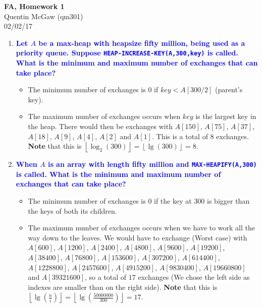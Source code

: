 \documentclass[11pt]{article}
\begin{document}
\begin{center} {\Large\bf FA, Homework 1}  \\ Quentin McGaw (qm301) \\ 02/02/17
\end{center}

\begin{enumerate}
\item \textbf{\textcolor{blue}{Let $A$ be a max-heap with heapsize fifty million, being used as a priority queue.  Suppose {\tt HEAP-INCREASE-KEY(A,300,key)} is called. What is the minimum and maximum number of exchanges that can take place?}}
    \begin{itemize}
        \item The minimum number of exchanges is $0$ if $key < A[300/2]$ (parent's key).
        \item The maximum number of exchanges occurs when $key$ is the largest key in the heap. There would then be exchanges with $A[150]$, $A[75]$, $A[37]$, $A[18]$, $A[9]$, $A[4]$, $A[2]$ and $A[1]$. This is a total of $8$ exchanges. \textbf{Note} that this is $\left \lfloor{\log_2(300)}\right \rfloor = \left \lfloor{\lg(300)}\right \rfloor = 8$.
    \end{itemize}
    
\item \textbf{\textcolor{blue}{When $A$ is an array with length fifty million and {\tt MAX-HEAPIFY(A,300)} is called. What is the minimum and maximum number of exchanges that can take place?}}
    \begin{itemize}
        \item The minimum number of exchanges is $0$ if the key at $300$ is bigger than the keys of both its children.
        \item The maximum number of exchanges occurs when we have to work all the way down to the leaves. We would have to exchange (Worst case) with $A[600]$, $A[1200]$, $A[2400]$, $A[4800]$, $A[9600]$, $A[19200]$, $A[38400]$, $A[76800]$, $A[153600]$, $A[307200]$, $A[614400]$, $A[1228800]$, $A[2457600]$, $A[4915200]$, $A[9830400]$, $A[19660800]$ and $A[39321600]$, so a total of $17$ exchanges (We chose the left side as indexes are smaller than on the right side). \textbf{Note} that this is $\left \lfloor{\lg(\frac{n}{i})}\right \rfloor = \left \lfloor{\lg(\frac{50000000}{300})}\right \rfloor = 17$.
    \end{itemize}


\end{enumerate}
\end{document}
